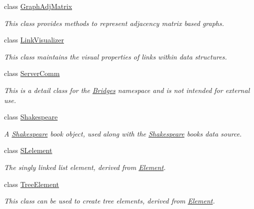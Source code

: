 \begin{DoxyCompactItemize}
class \hyperlink{classbridges_1_1_graph_adj_matrix}{Graph\+Adj\+Matrix}
\begin{DoxyCompactList}\small\item\em This class provides methods to represent adjacency matrix based graphs. \end{DoxyCompactList}\item 
class \hyperlink{classbridges_1_1_link_visualizer}{Link\+Visualizer}
\begin{DoxyCompactList}\small\item\em This class maintains the visual properties of links within data structures. \end{DoxyCompactList}\item 
class \hyperlink{classbridges_1_1_server_comm}{Server\+Comm}
\begin{DoxyCompactList}\small\item\em This is a detail class for the \hyperlink{namespacebridges_1_1_bridges}{Bridges} namespace and is not intended for external use. \end{DoxyCompactList}\item 
class \hyperlink{classbridges_1_1_shakespeare}{Shakespeare}
\begin{DoxyCompactList}\small\item\em A \hyperlink{classbridges_1_1_shakespeare}{Shakespeare} book object, used along with the \hyperlink{classbridges_1_1_shakespeare}{Shakespeare} books data source. \end{DoxyCompactList}\item 
class \hyperlink{classbridges_1_1_s_lelement}{S\+Lelement}
\begin{DoxyCompactList}\small\item\em The singly linked list element, derived from \hyperlink{classbridges_1_1_element}{Element}. \end{DoxyCompactList}\item 
class \hyperlink{classbridges_1_1_tree_element}{Tree\+Element}
\begin{DoxyCompactList}\small\item\em This class can be used to create tree elements, derived from \hyperlink{classbridges_1_1_element}{Element}. \end{DoxyCompactList}\end{DoxyCompactItemize}
